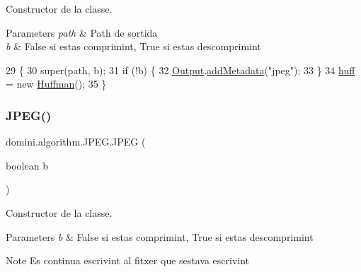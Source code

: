 Constructor de la classe. 


\begin{DoxyParams}{Parameters}
{\em path} & Path de sortida \\
\hline
{\em b} & False si estas comprimint, True si estas descomprimint \\
\hline
\end{DoxyParams}

\begin{DoxyCode}
29                                         \{
30         super(path, b);
31         \textcolor{keywordflow}{if} (!b) \{
32             \hyperlink{classdomini_1_1algorithm_1_1Algorithm_a4de9955411c656325adc391ef570c082}{Output}.\hyperlink{classpersistencia_1_1output_1_1Ctrl__Output_ae6d6857910a023982900ddc857b891f0}{addMetadata}(\textcolor{stringliteral}{"jpeg"});
33         \}
34         \hyperlink{classdomini_1_1algorithm_1_1JPEG_aacc6445baa7819e3f9139ffb78e0b8f4}{huff} = \textcolor{keyword}{new} \hyperlink{classHuffman}{Huffman}();
35     \}
\end{DoxyCode}
\mbox{\label{classdomini_1_1algorithm_1_1JPEG_ade39a15f3c5722b4975746fcee6ad364}} 
\subsubsection{\texorpdfstring{J\+P\+E\+G()}{JPEG()}\hspace{0.1cm}{\footnotesize\ttfamily [2/2]}}
{\footnotesize\ttfamily domini.\+algorithm.\+J\+P\+E\+G.\+J\+P\+EG (\begin{DoxyParamCaption}\item[{boolean}]{b }\end{DoxyParamCaption})\hspace{0.3cm}{\ttfamily [inline]}}



Constructor de la classe. 


\begin{DoxyParams}{Parameters}
{\em b} & False si estas comprimint, True si estas descomprimint \\
\hline
\end{DoxyParams}
\begin{DoxyNote}{Note}
Es continua escrivint al fitxer que s\textquotesingle{}estava escrivint 
\end{DoxyNote}

